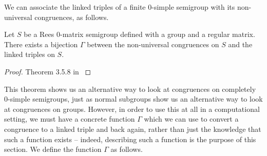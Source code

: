 We can associate the linked triples of a finite 0-simple semigroup with its
non-universal congruences, as follows.

\begin{theorem}
  \label{thm:linked-triple}
  Let $S$ be a Rees 0-matrix semigroup defined with a group and a regular
  matrix.  There exists a bijection $\Gamma$ between the non-universal
  congruences on $S$ and the linked triples on $S$.
  \begin{proof}
    Theorem 3.5.8 in \cite{howie}
  \end{proof}
\end{theorem}

This theorem shows us an alternative way to look at congruences on completely
0-simple semigroups, just as normal subgroups show us an alternative way to look
at congruences on groups.  However, in order to use this at all in a
computational setting, we must have a concrete function $\Gamma$ which we can
use to convert a congruence to a linked triple and back again, rather than just
the knowledge that such a function exists -- indeed, describing such a function
is the purpose of this section.  We define the function $\Gamma$ as follows.


